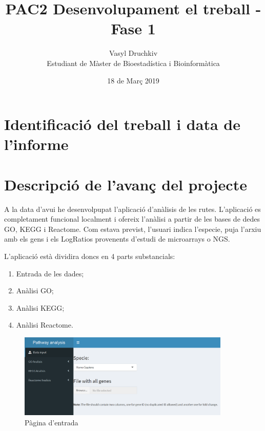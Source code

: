 \documentclass[]{article}
\title{PAC2  Desenvolupament el treball - Fase 1}
\date{18 de Març 2019}
\author{Vasyl Druchkiv \\ Estudiant de Màster de Bioestadística i Bioinformàtica}
\begin{document}
\maketitle
\makeatletter

\makeatother
\begin{spacing}{0.1}
\tableofcontents
\end{spacing}



    \section{Identificació del treball i data de l'informe}

    \section{Descripció de l'avanç del projecte} 

A la data d'avui he desenvolpupat l'aplicació d'anàlisis de les rutes. L'aplicació es completament funcional localment i ofereix l'anàlisi a partir de les bases de dedes GO, KEGG i Reactome. Com estava previst, l'usuari indica l'especie, puja l'arxiu amb els gens i els LogRatios provenents d'estudi de microarrays o NGS. 

L'aplicació està dividira doncs en 4 parts substancials:

\begin{enumerate}
\item Entrada de les dades;
\item Anàlisi GO;
\item Anàlisi KEGG;
\item Anàlisi Reactome.
\end{enumerate}

\begin{figure}[h!]
\caption{Pàgina d'entrada}
\centering
\includegraphics[width=0.9\textwidth]{App_F1}
\end{figure}
\end{document}

